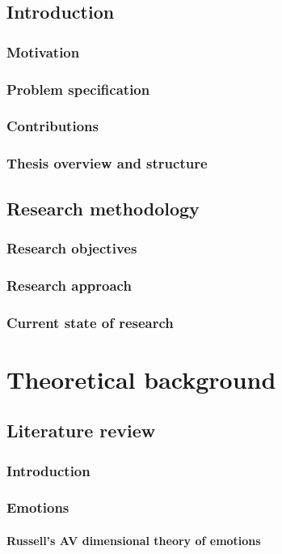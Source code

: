 \chapter{Introduction}
  \section{Motivation}
  \section{Problem specification}
  \section{Contributions}
  \section{Thesis overview and structure}

\chapter{Research methodology}
  \section{Research objectives}
  \section{Research approach}
  \section{Current state of research}

\part{Theoretical background}

\chapter{Literature review}
  \section{Introduction}
  \section{Emotions}
    \subsection{Russell's AV dimensional theory of emotions}

